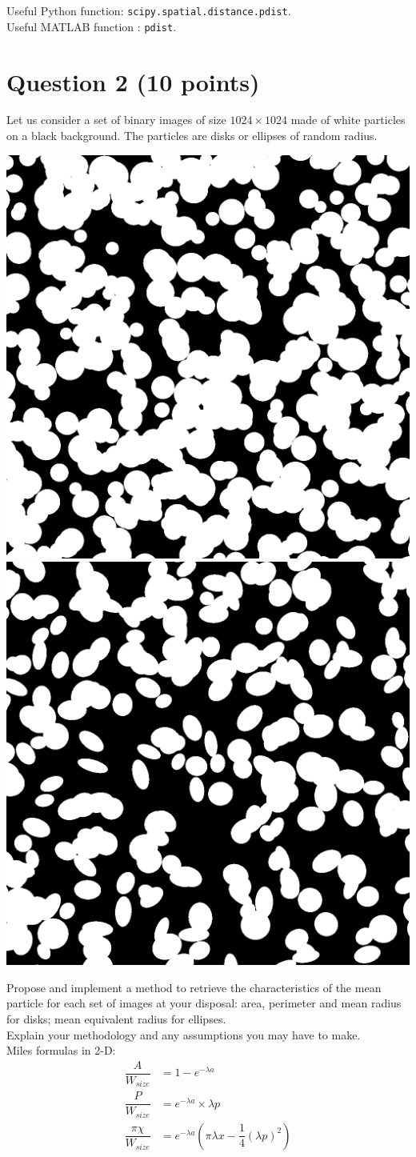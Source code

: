 \documentclass{article}
\begin{document}
Useful Python function: \texttt{scipy.spatial.distance.pdist}.\\

Useful MATLAB function	: \texttt{pdist}.




















\section{Question 2 (10 points)}
Let us consider a set of binary images of size $1024\times 1024$ made of white particles on a black background. The particles are disks or ellipses of random radius.

\begin{center}
\includegraphics[width=.3\textwidth]{I_400_2.png}
\qquad
\includegraphics[width=.3\textwidth]{I_250_7.png}
\end{center}

Propose and implement a method to retrieve the characteristics of the mean particle for each set of images at your disposal: area, perimeter and mean radius for disks; mean equivalent radius for ellipses.\\

Explain your methodology and any assumptions you may have to make.\\

Miles formulas in 2-D:
\begin{align}
\dfrac{A}{W_{size}} & = 1-e^{-\lambda a}\\
\dfrac{P}{W_{size}} & = e^{-\lambda a}\times \lambda p\\
\dfrac{\pi \chi}{W_{size}} & = e^{-\lambda a} \left( \pi \lambda x - \dfrac{1}{4}(\lambda p)^2 \right)
\end{align}
\end{document}
